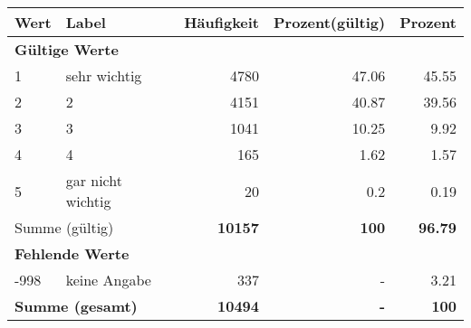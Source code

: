      \begin{longtable}{lXrrr}
     \toprule
     \textbf{Wert} & \textbf{Label} & \textbf{Häufigkeit} & \textbf{Prozent(gültig)} & \textbf{Prozent} \\
     \endhead
     \midrule
     \multicolumn{5}{l}{\textbf{Gültige Werte}}\\

     1 &
     \multicolumn{1}{X}{ sehr wichtig   } &


       \num{4780} &
       \num[round-mode=places,round-precision=2]{47.06} &
         \num[round-mode=places,round-precision=2]{45.55} \\

     2 &
     \multicolumn{1}{X}{ 2   } &


       \num{4151} &
       \num[round-mode=places,round-precision=2]{40.87} &
         \num[round-mode=places,round-precision=2]{39.56} \\

     3 &
     \multicolumn{1}{X}{ 3   } &


       \num{1041} &
       \num[round-mode=places,round-precision=2]{10.25} &
         \num[round-mode=places,round-precision=2]{9.92} \\

     4 &
     \multicolumn{1}{X}{ 4   } &


       \num{165} &
       \num[round-mode=places,round-precision=2]{1.62} &
         \num[round-mode=places,round-precision=2]{1.57} \\

     5 &
     \multicolumn{1}{X}{ gar nicht wichtig   } &


       \num{20} &
       \num[round-mode=places,round-precision=2]{0.2} &
         \num[round-mode=places,round-precision=2]{0.19} \\
     \midrule
     \multicolumn{2}{l}{Summe (gültig)} &
       \textbf{\num{10157}} &
     \textbf{\num{100}} &
       \textbf{\num[round-mode=places,round-precision=2]{96.79}} \\
     \multicolumn{5}{l}{\textbf{Fehlende Werte}}\\
       -998 &
       keine Angabe &
         \num{337} &
        - &
         \num[round-mode=places,round-precision=2]{3.21} \\
     \midrule
     \multicolumn{2}{l}{\textbf{Summe (gesamt)}} &
          \textbf{\num{10494}} &
        \textbf{-} &
        \textbf{\num{100}} \\
     \bottomrule
     \end{longtable}
     
